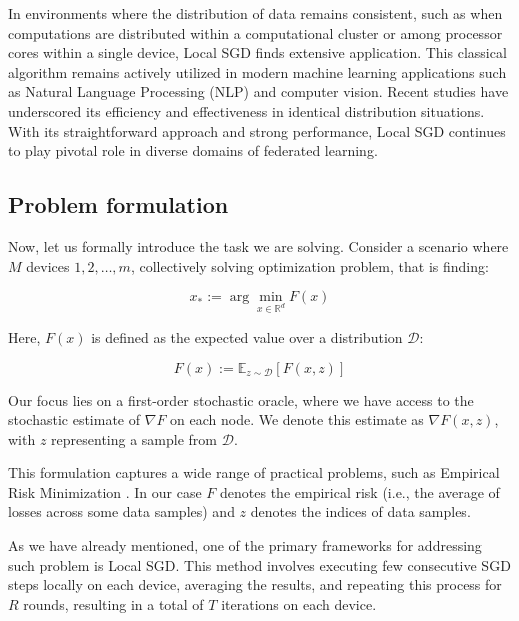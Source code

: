 In environments where the distribution of data remains consistent, such as when computations are distributed within a computational cluster or among processor cores within a single device, Local SGD finds extensive application. This classical algorithm remains actively utilized in modern machine learning applications such as Natural Language Processing (NLP) and computer vision. Recent studies \citep{LocalSGD_LLM, LocalSGD_CV} have underscored its efficiency and effectiveness in identical distribution situations. With its straightforward approach and strong performance, Local SGD continues to play pivotal role in diverse domains of federated learning.

\vspace{10pt}

\subsection{Problem formulation}

Now, let us formally introduce the task we are solving. Consider a scenario where \( M \) devices \( 1, 2, \ldots, m \), collectively solving optimization problem, that is finding:

\[ x_* := \arg\min_{x \in \mathbb{R}^d} F(x) \]

Here, \( F(x) \) is defined as the expected value over a distribution \( \mathcal{D} \):

\[ F(x) := \mathbb{E}_{z \sim \mathcal{D}} [F(x, z)] \]


Our focus lies on a first-order stochastic oracle, where we have access to the stochastic estimate of \( \nabla F \) on each node. We denote this estimate as \( \nabla F(x, z) \), with \( z \) representing a sample from \( \mathcal{D} \).

This formulation captures a wide range of practical problems, such as Empirical Risk Minimization \citep{Vapnik}. In our case \( F \) denotes the empirical risk (i.e., the average of losses across some data samples) and \( z \) denotes the indices of data samples.

\vspace{10pt}

As we have already mentioned, one of the primary frameworks for addressing such problem is Local SGD. This method involves executing few consecutive SGD steps locally on each device, averaging the results, and repeating this process for $R$ rounds, resulting in a total of $T$ iterations on each device.

